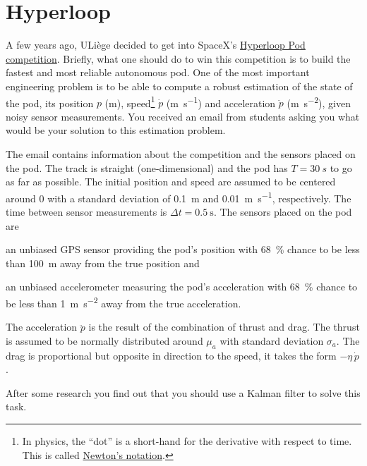 \documentclass[11pt, a4paper]{article}
\begin{document}
\newpage

\section{Hyperloop}

A few years ago, ULiège decided to get into SpaceX's \href{https://en.wikipedia.org/wiki/Hyperloop_pod_competition}{Hyperloop Pod competition}. Briefly, what one should do to win this competition is to build the fastest and most reliable autonomous pod. One of the most important engineering problem is to be able to compute a robust estimation of the state of the pod, \ie{} its position $p$ (\si{\meter}), speed\footnote{In physics, the \enquote{dot} is a short-hand for the derivative with respect to time. This is called \href{https://en.wikipedia.org/wiki/Notation_for_differentiation\#Newton's_notation}{Newton's notation}.} $\dot{p}$ (\si{\meter\per\second}) and acceleration $\ddot{p}$ (\si{\meter\per\second\squared}), given noisy sensor measurements. You received an email from students asking you what would be your solution to this estimation problem.

The email contains information about the competition and the sensors placed on the pod. The track is straight (one-dimensional) and the pod has $T = \SI{30}{s}$ to go as far as possible. The initial position and speed are assumed to be centered around 0 with a standard deviation of \SI{0.1}{\meter} and \SI{0.01}{\meter\per\second}, respectively. The time between sensor measurements is $\Delta t = \SI{0.5}{\second}$.
The sensors placed on the pod are
\begin{enumerate*}[label=\arabic*)]
    \item an unbiased GPS sensor providing the pod's position with \SI{68}{\percent} chance to be less than \SI{100}{\meter} away from the true position and
    \item an unbiased accelerometer measuring the pod's acceleration with \SI{68}{\percent} chance to be less than \SI{1}{\meter\per\second\squared} away from the true acceleration.
\end{enumerate*}
The acceleration $\ddot{p}$ is the result of the combination of thrust and drag. The thrust is assumed to be normally distributed around $\mu_a$ with standard deviation $\sigma_a$. The drag is proportional but opposite in direction to the speed, \ie{} it takes the form $-\eta \, \dot{p}$.

After some research you find out that you should use a Kalman filter to solve this task.
\end{document}
